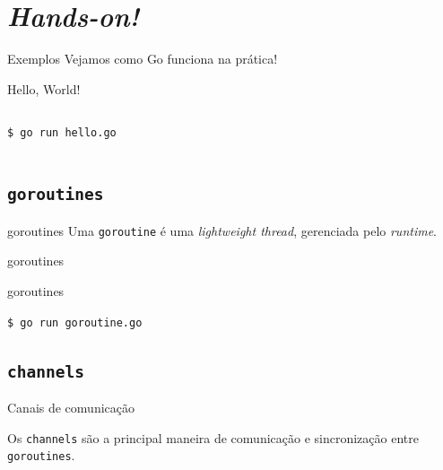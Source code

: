 \documentclass{beamer}
\begin{document}
\section{\em Hands-on!}
\begin{frame}
    {Exemplos}
    Vejamos como Go funciona na prática!
\end{frame}

\begin{frame}[fragile]
    {Hello, World!}
    \begin{columns}[c]
        

        \verb|$ go run hello.go|
        
    \end{columns}
\end{frame}

\subsection{\tt goroutines}
\begin{frame}
    {goroutines}
    Uma {\tt goroutine} é uma {\em lightweight thread}, gerenciada pelo {\em runtime}.
\end{frame}

\begin{frame}[fragile]
    {goroutines}

    
\end{frame}

\begin{frame}[fragile]
    {goroutines}

    \verb|$ go run goroutine.go|
    
\end{frame}

\subsection{\tt channels}
\begin{frame}
    {Canais de comunicação}

    Os {\tt channels} são a principal maneira de comunicação e sincronização
    entre {\tt goroutines}.
\end{frame}
\end{document}
